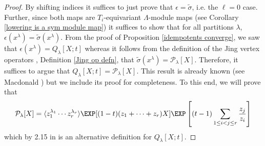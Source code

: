 \begin{proof}
    By shifting indices it suffices to just prove that $\epsilon = \widetilde{\sigma}$, i.e. the $\ell = 0$ case. Further, since both maps are $T_i$-equivariant $\Lambda$-module maps (see Corollary \ref{lowering is a sym module map}) it suffices to show that for all partitions $\lambda$, $\epsilon(x^{\lambda}) = \widetilde{\sigma}(x^{\lambda}).$ From the proof of Proposition \ref{idempotents converge}, we saw that $\epsilon(x^{\lambda}) = Q_{\lambda}[X;t]$ whereas it follows from the definition of the Jing vertex operators \cite{Jing_91}, Definition \ref{Jing op defn}, that $\widetilde{\sigma}(x^{\lambda}) = \mathcal{P}_{\lambda}[X]$. Therefore, it suffices to argue that $Q_{\lambda}[X;t] = \mathcal{P}_{\lambda}[X].$ This result is already known (see Macdonald \cite[Chapter 3, Section 5, Example $8$, page 238]{Macdonald}) but we include its proof for completeness. To this end, we will prove that 
    \begin{equation}\label{symmetrization-plthysm}
        \mathcal{P}_{\lambda}[X] = \langle z_1^{\lambda_1}\cdots z_r^{\lambda_r} \rangle \EXP[(1-t)(z_1+\cdots+z_r)X]\EXP\left[(t-1)\sum_{1\leq i < j \leq r} \frac{z_j}{z_i}\right]
    \end{equation}
 which by 2.15 in \cite[Chapter 3]{Macdonald} is an alternative definition for $Q_{\lambda}[X;t].$


\end{proof}
